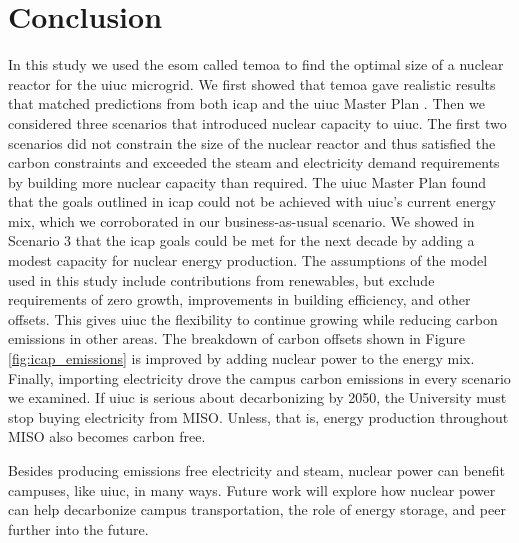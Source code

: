 \section{Conclusion}

In this study we used the \gls{esom} called \gls{temoa} to find the optimal
size of a nuclear reactor for the \gls{uiuc} microgrid. We first showed that
\gls{temoa} gave realistic results that matched predictions from both \gls{icap}
and the \gls{uiuc} Master Plan \cite{isee_illinois_2015, affiliated_engineers_inc_utilities_2015}.
Then we considered three scenarios that introduced nuclear capacity to
\gls{uiuc}. The first two scenarios did not constrain the size of the nuclear
reactor and thus satisfied the carbon constraints and exceeded the steam
and electricity demand requirements by building more nuclear capacity than
required.
The \gls{uiuc} Master Plan found that the goals outlined in \gls{icap} could
not be achieved with \gls{uiuc}'s current energy mix, which we corroborated in
our business-as-usual scenario. We showed in Scenario 3 that the \gls{icap}
goals could be met for the next decade by adding a modest capacity for nuclear
energy production. The assumptions of the model used in this study include
contributions from renewables, but exclude requirements of zero growth,
improvements in building efficiency, and other offsets. This gives \gls{uiuc}
the flexibility to continue growing while reducing carbon emissions in other
areas. The breakdown of carbon offsets shown in Figure \ref{fig:icap_emissions}
is improved by adding nuclear power to the energy mix.
Finally, importing electricity drove the campus carbon emissions in every
scenario we examined. If \gls{uiuc} is serious about decarbonizing by 2050, the
University must stop buying electricity from MISO. Unless, that is, energy
production throughout MISO also becomes carbon free.

Besides producing emissions free electricity and steam, nuclear power can
benefit campuses, like \gls{uiuc}, in many ways. Future work will explore how
nuclear power can help decarbonize campus transportation, the role of energy
storage, and peer further into the future.

